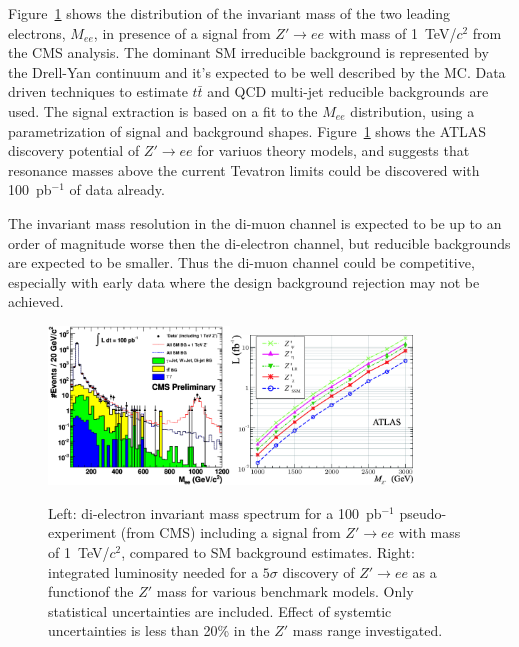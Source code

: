 \documentclass{cimento}
\begin{document}
Figure~\ref{fig:MeeAndZPrimeDisc} shows the distribution of the invariant mass 
of the two leading electrons, $M_{ee}$, in presence of 
a signal from $Z' \rightarrow ee$ with mass of 1~TeV/$c^2$ from the CMS analysis. 
The dominant SM irreducible background is represented by the Drell-Yan 
continuum and it's expected to be well described by the MC.
Data driven techniques to estimate $t\bar{t}$ and QCD multi-jet
reducible backgrounds are used. The signal extraction is based on a fit 
to the $M_{ee}$ distribution, using a parametrization of signal and 
background shapes. Figure~\ref{fig:MeeAndZPrimeDisc}
shows the ATLAS discovery potential of $Z' \rightarrow ee$
for variuos theory models, and suggests that resonance masses 
above the current Tevatron limits could be discovered with 
100~pb$^{-1}$ of data already. 

The invariant mass resolution in the di-muon channel is expected to be up to an 
order of magnitude worse then the di-electron channel, but reducible backgrounds
are expected to be smaller. Thus the di-muon channel could be competitive, 
especially with early data where the design background rejection may not be 
achieved.

\begin{figure}[htbp] 
\centering
\includegraphics[width=0.43\textwidth]{st_mass_all_withZPrime_ALLTOPO.eps}\includegraphics[width=0.43\textwidth]{fig9L.eps}
\caption{Left: di-electron invariant mass spectrum for a 
100~pb$^{-1}$ pseudo-experiment (from CMS) including a signal from 
$Z' \rightarrow ee$ with mass of 1~TeV/$c^2$, 
compared to SM background estimates. Right: integrated 
luminosity needed for a $5\sigma$ discovery of $Z' \rightarrow ee$
as a functionof the $Z'$ mass for various benchmark models. Only 
statistical uncertainties are included. 
Effect of systemtic uncertainties is less than 20\% in the $Z'$ mass
range investigated.}
\label{fig:MeeAndZPrimeDisc}
\end{figure}
\end{document}
